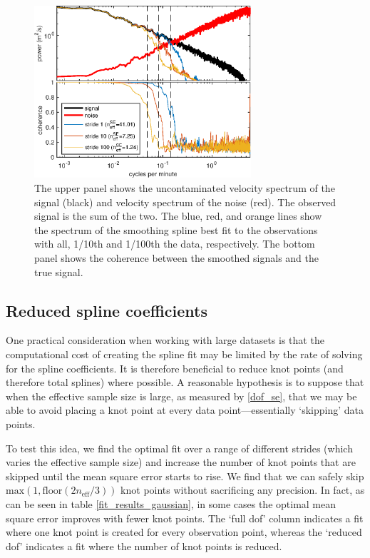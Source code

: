 \documentclass{ametsoc}
\begin{document}
\begin{figure}
  \centerline{\includegraphics[width=19pc,angle=0]{synthetic_process_and_spectrum_slope2degree3.eps}}
  \caption{The upper panel shows the uncontaminated velocity spectrum of the signal (black) and velocity spectrum of the noise (red). The observed signal is the sum of the two. The blue, red, and orange lines show the spectrum of the smoothing spline best fit to the observations with all, 1/10th and 1/100th the data, respectively. The bottom panel shows the coherence between the smoothed signals and the true signal.}
  \label{synthetic_process_and_spectrum}
\end{figure}


\subsection{Reduced spline coefficients} \label{reduced_coefficients}

One practical consideration when working with large datasets is that the computational cost of creating the spline fit may be limited by the rate of solving for the spline coefficients. It is therefore beneficial to reduce knot points (and therefore total splines) where possible. A reasonable hypothesis is to suppose that when the effective sample size is large, as measured by \eqref{dof_se}, that we may be able to avoid placing a knot point at every data point---essentially `skipping' data points.

To test this idea, we find the optimal fit over a range of different strides (which varies the effective sample size) and increase the number of knot points that are skipped until the mean square error starts to rise. We find that we can safely skip $\textrm{max}(1,\textrm{floor}(2n_{\textrm{eff}}/3))$ knot points without sacrificing any precision. In fact, as can be seen in table \ref{fit_results_gaussian}, in some cases the optimal mean square error improves with fewer knot points. The `full dof' column indicates a fit where one knot point is created for every observation point, whereas the `reduced dof' indicates a fit where the number of knot points is reduced.
\end{document}
